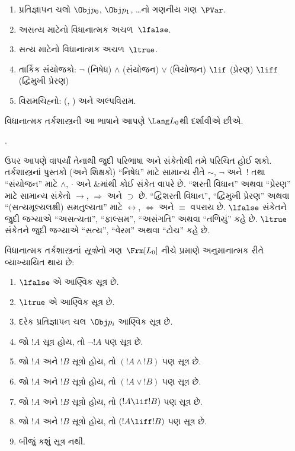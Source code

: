 \begin{enumerate}
\item પ્રતિજ્ઞાપન ચલો $\Obj p_0$, $\Obj p_1$, \dots નો
  ગણનીય ગણ~$\PVar$.
\item અસત્ય માટેનો વિધાનાત્મક અચળ~$\lfalse$.
\item સત્ય માટેનો વિધાનાત્મક અચળ~$\ltrue$.
\item તાર્કિક સંયોજકો:
  \startycommalist
  \ycomma $\lnot$ (નિષેધ)%
  \ycomma $\land$ (સંયોજન)%
  \ycomma $\lor$ (વિયોજન)%
  \ycomma $\lif$ (પ્રેરણ)%
  \ycomma $\liff$ (દ્વિમુખી પ્રેરણ)%
\item વિરામચિહ્નો: (, ) અને અલ્પવિરામ.
\end{enumerate}

વિધાનાત્મક તર્કશાસ્ત્રની આ ભાષાને આપણે $\Lang L_0$થી દર્શાવીએ છીએ.

.




\begin{intro}
ઉપર આપણે વાપર્યાં તેનાથી જુદી પરિભાષા અને સંકેતોથી તમે પરિચિત હોઈ
શકો. તર્કશાસ્ત્રનાં પુસ્તકો (અને શિક્ષકો) ``નિષેધ'' માટે સામાન્ય રીતે
$\sim$, $\neg$ અને~!\; તથા ``સંયોજન'' માટે $\wedge$, $\cdot$ અને
$\&$માંથી કોઈ સંકેત વાપરે છે. ``શરતી વિધાન'' અથવા ``પ્રેરણ'' માટે
સામાન્ય સંકેતો $\rightarrow$, $\Rightarrow$ અને $\supset$ છે.
``દ્વિશરતી વિધાન'', ``દ્વિમુખી પ્રેરણ'' અથવા
  ``(સત્યમૂલ્યલક્ષી) સમતુલ્યતા'' માટે $\leftrightarrow$,
  $\Leftrightarrow$ અને $\equiv$ વપરાય છે.
$\lfalse$ સંકેતને જુદી જગ્યાએ ``અસત્યતા'',
  ``ફાલ્સમ'', ``અસંગતિ'' અથવા ``તળિયું'' કહે છે.
$\ltrue$ સંકેતને જુદી જગ્યાએ ``સત્ય'',
  ``વેરમ'' અથવા ``ટોચ'' કહે છે.
\end{intro}

\begin{defn}[સૂત્ર]
વિધાનાત્મક તર્કશાસ્ત્રનાં \emph{સૂત્રો}નો ગણ~$\Frm[L_0]$
નીચે પ્રમાણે અનુમાનાત્મક રીતે વ્યાખ્યાયિત થાય છે:
\begin{enumerate}
\item $\lfalse$ એ આણ્વિક સૂત્ર છે.

\item $\ltrue$ એ આણ્વિક સૂત્ર છે.

\item દરેક પ્રતિજ્ઞાપન ચલ~$\Obj p_i$ આણ્વિક
  સૂત્ર છે.

\item જો $!A$ સૂત્ર હોય, તો $\lnot !A$ પણ
  સૂત્ર છે.

\item જો $!A$ અને $!B$ સૂત્રો હોય, તો $(!A \land
  !B)$ પણ સૂત્ર છે.

\item જો $!A$ અને $!B$ સૂત્રો હોય, તો $(!A \lor !B)$
  પણ સૂત્ર છે.

\item જો $!A$ અને $!B$ સૂત્રો હોય, તો $(!A \lif !B)$
  પણ સૂત્ર છે.

\item જો $!A$ અને $!B$ સૂત્રો હોય, તો $(!A \liff !B)$
  પણ સૂત્ર છે.

\item બીજું કશું સૂત્ર નથી.
\end{enumerate}
\end{defn}


